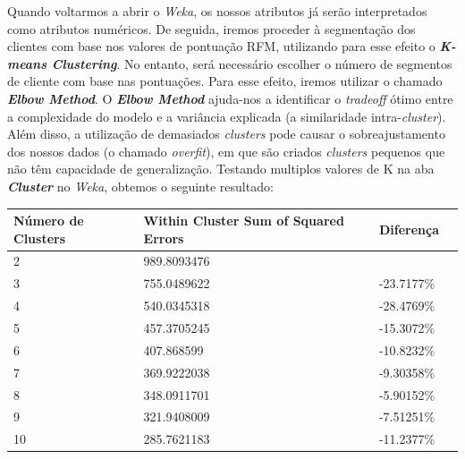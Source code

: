 \documentclass{easychair}
\begin{document}
\newpage
Quando voltarmos a abrir o \textit{Weka}, os nossos atributos já serão interpretados como atributos numéricos. De seguida, iremos proceder à segmentação dos clientes com base nos valores de pontuação RFM, utilizando para esse efeito o \textit{\textbf{K-means Clustering}}. No entanto, será necessário escolher o número de segmentos de cliente com base nas pontuações. Para esse efeito, iremos utilizar o chamado \textit{\textbf{Elbow Method}}\cite{RCCAFRM}.
O \textit{\textbf{Elbow Method}} ajuda-nos a identificar o \textit{tradeoff} ótimo entre a complexidade do modelo e a variância explicada (a similaridade intra-\textit{cluster}). Além disso, a utilização de demasiados \textit{clusters} pode causar o sobreajustamento dos nossos dados (o chamado \textit{overfit}), em que são criados \textit{clusters} pequenos que não têm capacidade de generalização.
Testando multiplos valores de K na aba \textit{\textbf{Cluster}} no \textit{Weka}, obtemos o seguinte resultado:

\begin{table}[htb]
\centering
\begin{tabular}{l|l|l|l}
Número de Clusters & Within Cluster Sum of Squared Errors  & Diferença &   \\
\hline
2                  & 989.8093476                                    &         &   \\
3                  & 755.0489622                                    & -23.7177\%  &   \\
4                  & 540.0345318                                    & -28.4769\% &   \\
5                  & 457.3705245                                    & -15.3072\%  &   \\
6                  & 407.868599                                     & -10.8232\%  &   \\
7                  & 369.9222038                                    & -9.30358\%  &   \\
8                  & 348.0911701                                    & -5.90152\%  &   \\
9                  & 321.9408009                                    & -7.51251\%  &   \\
10                 & 285.7621183                                    & -11.2377\%  &  
\end{tabular}
\end{table}
\end{document}
